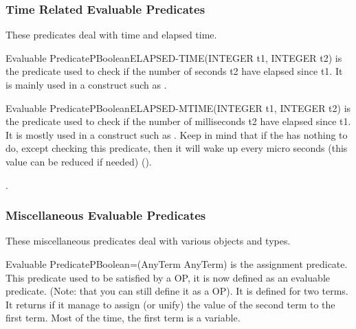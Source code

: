 \subsubsection{Time Related Evaluable Predicates}

These predicates deal with time and elapsed time.

\begin{typeep}{Evaluable Predicate}{PBoolean}{ELAPSED-TIME}{(INTEGER t1, INTEGER t2)}
is the predicate used to check if the number of seconds t2 have elapsed since
t1. It is mainly used in a construct such as .
\end{typeep}

\begin{typeep}{Evaluable Predicate}{PBoolean}{ELAPSED-MTIME}{(INTEGER t1, INTEGER t2)}
is the predicate used to check if the number of milliseconds t2 have elapsed
since t1.  It is mostly used in a construct such as . Keep in mind that if the \CPK{} has nothing to do, except
checking this predicate, then it will wake up every  micro seconds (this value can be reduced if
needed) ().

.
\end{typeep}

\subsubsection{Miscellaneous Evaluable Predicates}

These miscellaneous predicates deal with various objects and types.

\begin{typeep}{Evaluable Predicate}{PBoolean}{=}{(AnyTerm AnyTerm)}
is the assignment predicate. This predicate used to be satisfied by a OP, it is
now defined as an evaluable predicate. (Note: that you can still define it as a
OP). It is defined for two terms. It returns  if it manage to assign
(or unify) the value of the second term to the first term. Most of the time,
the first term is a variable.
\end{typeep}

